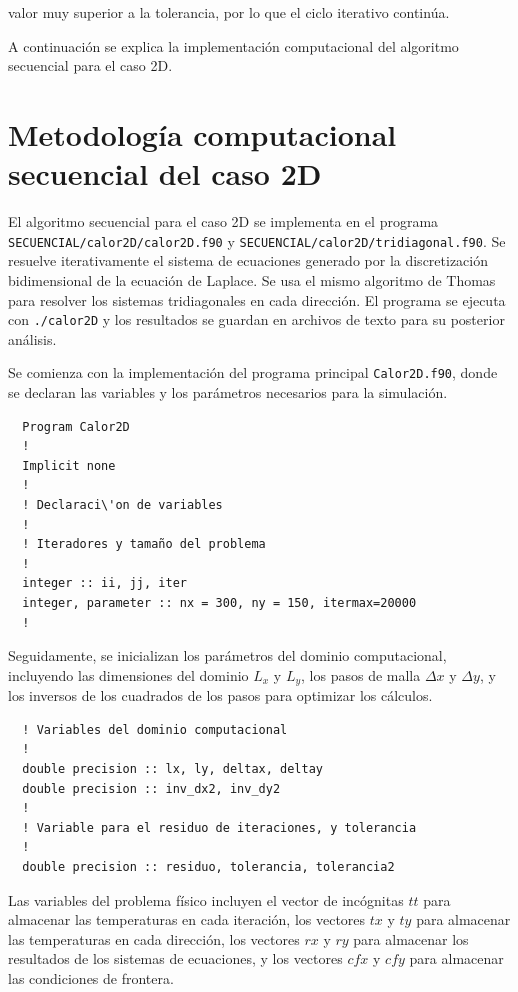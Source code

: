 \documentclass[11pt,a4paper]{article}
\begin{document}
valor muy superior a la tolerancia, por lo que el ciclo iterativo contin\'ua.

\medskip

A continuaci\'on se explica la implementaci\'on computacional del algoritmo 
secuencial para el caso 2D.

\section{Metodolog\'ia computacional secuencial del caso 2D}

El algoritmo secuencial para el caso 2D se implementa en el programa 
\texttt{SECUENCIAL/calor2D/calor2D.f90} y
\texttt{SECUENCIAL/calor2D/tridiagonal.f90}. Se resuelve iterativamente el 
sistema de ecuaciones generado por la discretización bidimensional de la 
ecuación de Laplace. Se usa el mismo algoritmo de Thomas para resolver los 
sistemas tridiagonales en cada dirección. El programa se ejecuta con 
\verb|./calor2D| y los resultados se guardan en archivos de texto para su 
posterior análisis.

\medskip

Se comienza con la implementación del programa principal \texttt{Calor2D.f90}, 
donde se declaran las variables y los parámetros necesarios para la simulación.

\begin{verbatim}
  Program Calor2D
  !
  Implicit none
  !
  ! Declaraci\'on de variables
  !
  ! Iteradores y tamaño del problema
  !
  integer :: ii, jj, iter
  integer, parameter :: nx = 300, ny = 150, itermax=20000
  !
\end{verbatim}

Seguidamente, se inicializan los parámetros del dominio computacional, 
incluyendo las dimensiones del dominio $L_x$ y $L_y$, los pasos de malla 
$\Delta x$ y $\Delta y$, y los inversos de los cuadrados de los pasos para 
optimizar los cálculos.

\begin{verbatim}
  ! Variables del dominio computacional
  !
  double precision :: lx, ly, deltax, deltay
  double precision :: inv_dx2, inv_dy2
  !
  ! Variable para el residuo de iteraciones, y tolerancia
  !
  double precision :: residuo, tolerancia, tolerancia2
\end{verbatim}

Las variables del problema físico incluyen el vector de incógnitas $tt$ para 
almacenar las temperaturas en cada iteración, los vectores $tx$ y $ty$ para 
almacenar las temperaturas en cada dirección, los vectores $rx$ y $ry$ para 
almacenar los resultados de los sistemas de ecuaciones, y los vectores $cfx$ y 
$cfy$ para almacenar las condiciones de frontera.
\end{document}
